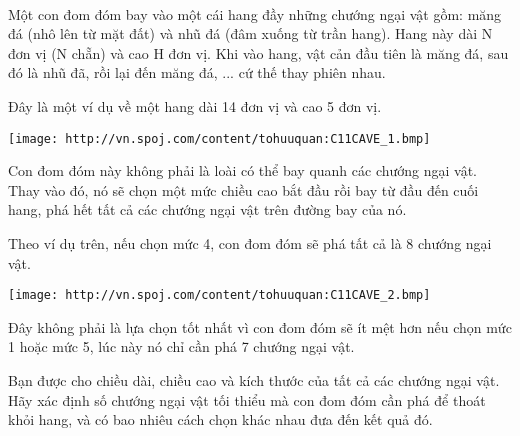  

Một con đom đóm bay vào một cái hang đầy những chướng ngại vật gồm: măng đá (nhô lên từ mặt đất) và nhũ đá (đâm xuống từ trần hang). Hang này dài N đơn vị (N chẵn) và cao H đơn vị. Khi vào hang, vật cản đầu tiên là măng đá, sau đó là nhũ đã, rồi lại đến măng đá, ... cứ thế thay phiên nhau.

Đây là một ví dụ về một hang dài 14 đơn vị và cao 5 đơn vị.


\texttt{[image: http://vn.spoj.com/content/tohuuquan:C11CAVE\_1.bmp]}

Con đom đóm này không phải là loài có thể bay quanh các chướng ngại vật. Thay vào đó, nó sẽ chọn một mức chiều cao bắt đầu rồi bay từ đầu đến cuối hang, phá hết tất cả các chướng ngại vật trên đường bay của nó.

Theo ví dụ trên, nếu chọn mức 4, con đom đóm sẽ phá tất cả là 8 chướng ngại vật.


\texttt{[image: http://vn.spoj.com/content/tohuuquan:C11CAVE\_2.bmp]}

Đây không phải là lựa chọn tốt nhất vì con đom đóm sẽ ít mệt hơn nếu chọn mức 1 hoặc mức 5, lúc này nó chỉ cần phá 7 chướng ngại vật.

Bạn được cho chiều dài, chiều cao và kích thước của tất cả các chướng ngại vật. Hãy xác định số chướng ngại vật tối thiểu mà con đom đóm cần phá để thoát khỏi hang, và có bao nhiêu cách chọn khác nhau đưa đến kết quả đó.